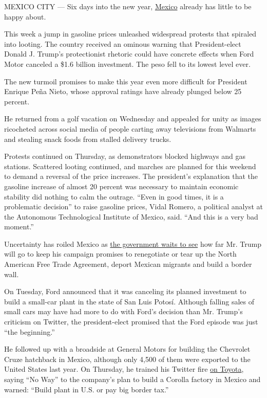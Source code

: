 MEXICO CITY --- Six days into the new year,
\href{https://www.nytimes.com/topic/destination/mexico?8qa}{Mexico}
already has little to be happy about.

This week a jump in gasoline prices unleashed widespread protests that
spiraled into looting. The country received an ominous warning that
President-elect Donald J. Trump's protectionist rhetoric could have
concrete effects when Ford Motor canceled a \$1.6 billion investment.
The peso fell to its lowest level ever.

The new turmoil promises to make this year even more difficult for
President Enrique Peña Nieto, whose approval ratings have already
plunged below 25 percent.

He returned from a golf vacation on Wednesday and appealed for unity as
images ricocheted across social media of people carting away televisions
from Walmarts and stealing snack foods from stalled delivery trucks.

Protests continued on Thursday, as demonstrators blocked highways and
gas stations. Scattered looting continued, and marches are planned for
this weekend to demand a reversal of the price increases. The
president's explanation that the gasoline increase of almost 20 percent
was necessary to maintain economic stability did nothing to calm the
outrage. ``Even in good times, it is a problematic decision'' to raise
gasoline prices, Vidal Romero, a political analyst at the Autonomous
Technological Institute of Mexico, said. ``And this is a very bad
moment.''

Uncertainty has roiled Mexico as
\href{https://www.nytimes.com/2016/11/10/world/americas/mexico-donald-trump-peso.html?action=click\&contentCollection=Americas\&module=RelatedCoverage\&region=Marginalia\&pgtype=article}{the
government waits to see} how far Mr. Trump will go to keep his campaign
promises to renegotiate or tear up the North American Free Trade
Agreement, deport Mexican migrants and build a border wall.

On Tuesday, Ford announced that it was canceling its planned investment
to build a small-car plant in the state of San Luis Potosí. Although
falling sales of small cars may have had more to do with Ford's decision
than Mr. Trump's criticism on Twitter, the president-elect promised that
the Ford episode was just ``the beginning.''

He followed up with a broadside at General Motors for building the
Chevrolet Cruze hatchback in Mexico, although only 4,500 of them were
exported to the United States last year. On Thursday, he trained his
Twitter fire
\href{https://twitter.com/realDonaldTrump/status/817071792711942145}{on
Toyota}, saying ``No Way'' to the company's plan to build a Corolla
factory in Mexico and warned: ``Build plant in U.S. or pay big border
tax.''

